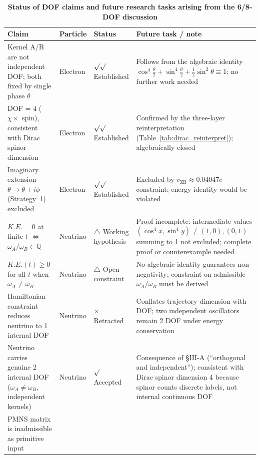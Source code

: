 \documentclass[%
 reprint, amsmath,amssymb, aps, prb, ]{revtex4-2}
\numberwithin{equation}{section}
\newcommand{\iphase}{\theta}
\begin{document}
\begin{table}[t!]
\centering
\caption{\textbf{Status of DOF claims and future research tasks arising from the 6/8-DOF discussion}}
\label{tab:dof_summary}
\renewcommand{\arraystretch}{1.4}
\begin{tabular}{p{4.2cm}p{1.8cm}p{2.4cm}p{6.6cm}}
\toprule
\textbf{Claim} & \textbf{Particle} & \textbf{Status} & \textbf{Future task / note} \\
\midrule
Kernel A/B are not independent DOF; both fixed by single phase $\theta$
& Electron
& $\surd\surd$ Established
& Follows from the algebraic identity $\cos^4\!\tfrac{\theta}{2}+\sin^4\!\tfrac{\theta}{2}+\tfrac{1}{2}\sin^2\theta\equiv1$; no further work needed \\
\addlinespace[0.3cm]
DOF = 4 ($\chi\times$ spin), consistent with Dirac spinor dimension
& Electron
& $\surd\surd$ Established
& Confirmed by the three-layer reinterpretation (Table~\ref{tab:dirac_reinterpret}); algebraically closed \\
\addlinespace[0.3cm]
Imaginary extension $\iphase\to\iphase+i\phi$ (Strategy~1) excluded
& Electron
& $\surd\surd$ Established
& Excluded by $v_\mathrm{ZB}\approx0.04047c$ constraint; energy identity would be violated \\
\addlinespace[0.3cm]
$K.E.=0$ at finite $t$ $\Longleftrightarrow$ $\omega_A/\omega_B\in\mathbb{Q}$
& Neutrino
& $\triangle$ Working hypothesis
& Proof incomplete: intermediate values $(\cos^4 x, \sin^4 y)\neq(1,0),(0,1)$ summing to 1 not excluded; complete proof or counterexample needed \\
\addlinespace[0.3cm]
$K.E.(t)\geq0$ for all $t$ when $\omega_A\neq\omega_B$
& Neutrino
& $\triangle$ Open constraint
& No algebraic identity guarantees non-negativity; constraint on admissible $\omega_A/\omega_B$ must be derived \\
\addlinespace[0.3cm]
Hamiltonian constraint reduces neutrino to 1 internal DOF
& Neutrino
& $\times$ Retracted
& Conflates trajectory dimension with DOF; two independent oscillators remain 2 DOF under energy conservation \\
\addlinespace[0.3cm]
Neutrino carries genuine 2 internal DOF ($\omega_A\neq\omega_B$, independent kernels)
& Neutrino
& $\surd$ Accepted
& Consequence of \cite{hanamura09} §III-A (``orthogonal and independent''); consistent with Dirac spinor dimension 4 because spinor counts discrete labels, not internal continuous DOF \\
\addlinespace[0.3cm]
PMNS matrix is inadmissible as primitive input

\end{tabular}
\end{table}
\end{document}
